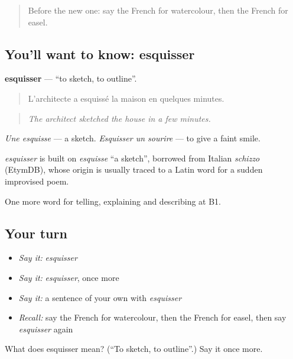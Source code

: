 \label{lesson:FR-C516-esquisser}



\begin{quote}
Before the new one: say the French for watercolour, then the French for easel.
\end{quote}

\subsection*{You'll want to know: esquisser}
\textbf{esquisser} — \textquotedblleft{}to sketch, to outline\textquotedblright{}.

\begin{quote}
L'architecte a esquissé la maison en quelques minutes.
\end{quote}

\begin{quote}
\emph{The architect sketched the house in a few minutes.}
\end{quote}

\emph{Une esquisse} — a sketch. \emph{Esquisser un sourire} — to give a faint smile.

\begin{cousinweb}
\emph{esquisser} is built on \emph{esquisse} \textquotedblleft{}a sketch\textquotedblright{}, borrowed from Italian \emph{schizzo} (EtymDB), whose origin is usually traced to a Latin word for a sudden improvised poem.
\end{cousinweb}

\begin{grammarlens}[title={What you've built}]
One more word for telling, explaining and describing at B1.
\end{grammarlens}

\subsection*{Your turn}
\begin{itemize}
\raggedright
  \item \emph{Say it:} \emph{esquisser}
  \item \emph{Say it:} \emph{esquisser}, once more
  \item \emph{Say it:} a sentence of your own with \emph{esquisser}
  \item \emph{Recall:} say the French for watercolour, then the French for easel, then say \emph{esquisser} again
\end{itemize}

\begin{tcolorbox}[breakable,colback=teal!4,colframe=teal!35!black,title={Before you move on}]
What does esquisser mean? (\textquotedblleft{}To sketch, to outline\textquotedblright{}.) Say it once more.
\end{tcolorbox}
